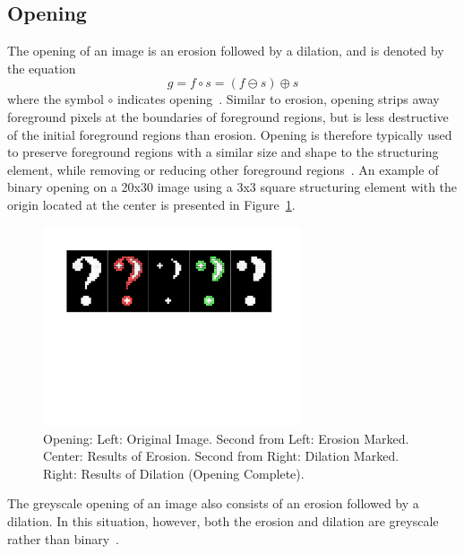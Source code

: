 \documentclass{sig-alternate}
\begin{document}
\subsection{Opening}\label{opening}
The opening of an image is an erosion followed by a dilation, and is denoted by the equation
\begin{equation*}
g = f \circ s = (f \ominus s) \oplus s
\end{equation*}
where the symbol $\circ$ indicates opening~\cite{MorphologyWikiAnonymous, MorphologyBook:2000}. Similar to erosion, opening strips away foreground pixels at the boundaries of foreground regions, but is less destructive of the initial foreground regions than erosion. Opening is therefore typically used to preserve foreground regions with a similar size and shape to the structuring element, while removing or reducing other foreground regions~\cite{MorphologyWiki}. An example of binary opening on a 20x30 image using a 3x3 square structuring element with the origin located at the center is presented in Figure~\ref{binary opening figure}.
\begin{figure}
\centering
\includegraphics[width=3in,trim={0 4.75in 0 0},clip]{opening}
\caption{Opening: Left: Original Image. Second from Left: Erosion Marked. Center: Results of Erosion. Second from Right: Dilation Marked. Right: Results of Dilation (Opening Complete).}
\label{binary opening figure}
\end{figure}

The greyscale opening of an image also consists of an erosion followed by a dilation. In this situation, however, both the erosion and dilation are greyscale rather than binary~\cite{MorphologyPaper:1987}.
\end{document}
